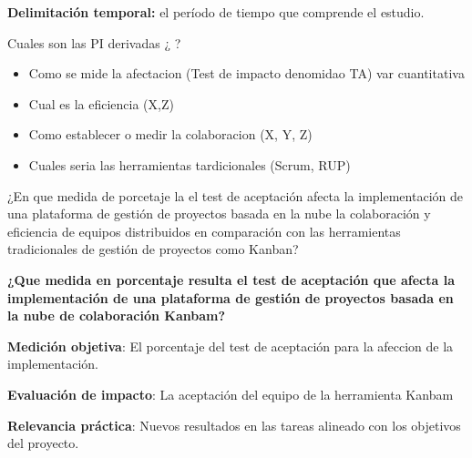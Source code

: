 \textbf{Delimitación temporal:} el período de tiempo que comprende el estudio.





    Cuales son las PI derivadas ¿ ?
        \begin{itemize}
            \item Como se mide la afectacion (Test de impacto denomidao TA) var cuantitativa 
            \item Cual es la eficiencia (X,Z)
            \item Como establecer o medir la colaboracion (X, Y, Z)
            \item Cuales seria las herramientas tardicionales (Scrum, RUP)
        \end{itemize}


    ¿En que medida de porcetaje la el test de aceptación  afecta la implementación de una plataforma de gestión de proyectos basada en la nube la colaboración y eficiencia de equipos distribuidos en comparación con las herramientas tradicionales de gestión de proyectos como Kanban?

 \textbf{ ¿Que medida en porcentaje resulta el test de aceptación que  afecta la implementación de una plataforma de gestión de proyectos basada en la nube de colaboración Kanbam?}


\textbf{Medición objetiva}: El porcentaje del test de aceptación para la afeccion de la implementación.
    \item \textbf{Evaluación de impacto}: La aceptación del equipo de la herramienta Kanbam
    \item \textbf{Relevancia práctica}:  Nuevos resultados en las tareas  alineado con los objetivos del proyecto.


 